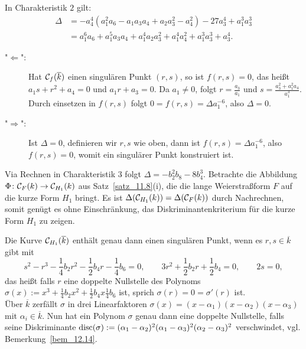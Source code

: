 \begin{bew}[2. Fall: $\Char(k) = 2$ und $a_1 \neq 0$]
	In Charakteristik $2$ gilt:
	\begin{equation}
	\begin{aligned}
		\Delta &= -a_4^4 (a_1^2 a_6 - a_1 a_3 a_4 + a_2 a_3^2 - a_4^2) - 27a_3^4 + a_1^3 a_3^3 \\
		&= a_1^6 a_6 + a_1^5 a_3a_4 + a_1^4a_2a_3^2 + a_1^4a_4^2 + a_1^3 a_3^3 +a_3^4.
	\end{aligned}
	\end{equation}
	\begin{description}
		\item["$\Leftarrow$":] Hat $\mathcal{C}_f(\overline{k})$ einen singulären Punkt $(r,s)$, so ist $f(r,s) = 0$, das heißt $a_1 s + r^2 + a_4 = 0$ und $a_1 r + a_3 = 0$. Da $a_1 \neq 0$, folgt $r = \frac{a_3}{a_1}$ und $s = \frac{a_3^2+a_1^2a_4}{a_1^3}$. Durch einsetzen in $f(r,s)$ folgt $0 = f(r,s) = \Delta a_1^{-6}$, also $\Delta = 0$.		
		\item["$\Rightarrow$":] Ist $\Delta = 0$, definieren wir $r,s$ wie oben, dann ist $f(r,s) = \Delta a_1^{-6}$, also $f(r,s) = 0$, womit ein singulärer Punkt konstruiert ist.
	\end{description}
\end{bew}

\begin{bew}[3. Fall: $\Char(k)=3$]
	Via Rechnen in Charakteristik $3$ folgt $\Delta = -b_2^2 b_8 - 8b_4^3$. Betrachte die Abbildung $\Phi\colon \mathcal{C}_F(k) \rightarrow \mathcal{C}_{H_1}(k)$ aus Satz~\ref{satz_11.8}(i), die die lange Weierstraßform $F$ auf die kurze Form $H_1$ bringt. Es ist $\Delta(\mathcal{C}_{H_1}(k)) = \Delta(\mathcal{C}_F(k))$ durch Nachrechnen, somit genügt es ohne Einschränkung, das Diskriminantenkriterium für die kurze Form $H_1$ zu zeigen.
\end{bew}

\begin{bew}
	Die Kurve $\mathcal{C}_{H_1}(\overline{k})$ enthält genau dann einen singulären Punkt, wenn es $r,s \in \overline{k}$ gibt mit
	\[ s^2 - r^3 - \frac{1}{4} b_2 r^2 - \frac{1}{2}b_4 r - \frac{1}{4} b_6 = 0, \qquad 3r^2 + \frac{1}{2} b_2r + \frac{1}{2} b_4 = 0,  \qquad 2s = 0, \]
	das heißt falls $r$ eine doppelte Nullstelle des Polynoms $\sigma(x) := x^3 + \frac{1}{4} b_2 x^2 + \frac{1}{2} b_4x \frac{1}{4} b_6$ ist, sprich $\sigma(r) = 0 = \sigma'(r)$ ist. \\
	Über $\overline{k}$ zerfällt $\sigma$ in drei Linearfaktoren $\sigma(x) = (x-\alpha_1)(x-\alpha_2)(x-\alpha_3)$ mit $\alpha_i \in \overline{k}$. Nun hat ein Polynom $\sigma$ genau dann eine doppelte Nullstelle, falls seine Diskriminante $\operatorname{disc}(\sigma) := (\alpha_1 - \alpha_2)^2 (\alpha_1 - \alpha_3)^2 (\alpha_2 - \alpha_3)^2$ verschwindet, vgl. Bemerkung~\ref{bem_12.14}.
\end{bew}

